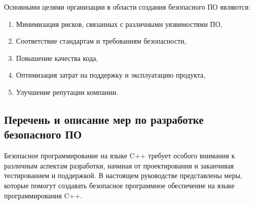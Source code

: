 Основными целями организации в области создания безопасного ПО являются:

\begin{enumerate}
    \item Минимизация рисков, связанных с различными уязвимостями ПО,
    \item Соответствие стандартам и требованиям безопасности,
    \item Повышение качества кода,
    \item Оптимизация затрат на поддержку и эксплуатацию продукта,
    \item Улучшение репутации компании.
\end{enumerate}

\subsection{Перечень и описание мер по разработке безопасного ПО}

Безопасное программирование на языке C++ требует особого внимания к различным аспектам разработки, начиная от проектирования и заканчивая тестированием и поддержкой. В настоящем руководстве представлены меры, которые помогут создавать безопасное программное обеспечение на языке программирования C++.

